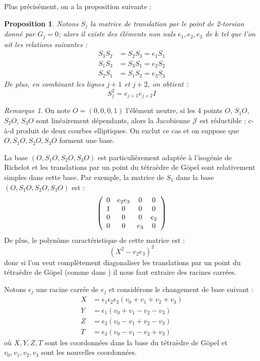 \documentclass[a4paper]{article}
\newtheorem{proposition}[theoreme]{Proposition}
\theoremstyle{definition}
\theoremstyle{remark}
\newtheorem{remarque}{Remarque}
\numberwithin{equation}{section}
\begin{document}
Plus précisément, on a la proposition suivante :

\begin{proposition}
Notons $S_j$ la matrice de translation par le point de 2-torsion donné par $G_j=0$; alors il existe des éléments non nuls $e_1,e_2,e_3$ de $k$ tel que l'on ait les relations suivantes :
\begin{align}
S_3S_2 &= S_2S_3 = e_1S_1 \\
S_1S_3 &= S_3S_1 = e_2S_2 \\
S_2S_1 &= S_1S_2 = e_3S_3
\end{align}
De plus, en combinant les lignes $j+1$ et $j+2$, on obtient :
$$S_j^2 = e_{j+1}e_{j+2}I$$
\end{proposition}

\begin{remarque}
On note $O=(0,0,0,1)$ l'élément neutre, si les 4 points $O$, $S_1O$, $S_2O$, $S_3O$ sont linéairement dépendants, alors la Jacobienne $\mathcal{J}$ est réductible \citep{cassels-Flynn}; c-à-d produit de deux courbes elliptiques. On exclut ce cas et on suppose que $O,S_1O,S_2O,S_3O$ forment une base.
\end{remarque}

La base $(O,S_1O,S_2O,S_3O)$ est particulièrement adaptée à l'isogénie de Richelot et les translations par un point du tétraèdre de G\"opel sont relativement simples dans cette base. Par exemple, la matrice de $S_1$ dans la base  $(O,S_1O,S_2O,S_3O)$ est :
\[ \left(
  \begin{array}{ c c c c}
     0 & e_2e_3 & 0  & 0  \\
     1 & 0   & 0  & 0  \\
     0 & 0   & 0  & e_2 \\
     0 & 0   & e_3  & 0  \\
  \end{array} \right)
\]
De plus, le polynôme caractéristique de cette matrice est :
$$(X^2-e_2e_3)^2$$
donc si l'on veut complètement diagonaliser les translations par un point du tétraèdre de G\"opel (comme dans \citep{gaudry}) il nous faut extraire des racines carrées.

Notons $\epsilon_j$ une racine carrée de $e_j$ et considérons le changement de base suivant \citep{cassels-Flynn} :
\begin{align}
\label{chgBase}
X &= \epsilon_1\epsilon_2\epsilon_3(v_0+v_1+v_2+v_3) \\
Y &= \epsilon_1(v_0+v_1-v_2-v_3) \\
Z &= \epsilon_2(v_0-v_1+v_2-v_3) \\
T &= \epsilon_3(v_0-v_1-v_2+v_3)
\end{align}
où $X,Y,Z,T$ sont les coordonnées dans la base du tétraèdre de G\"opel et $v_0,v_1,v_2,v_3$ sont les nouvelles coordonnées.
\end{document}
